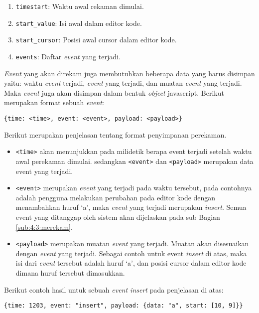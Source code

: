 \begin{enumerate}
    \item \verb|timestart|: Waktu awal rekaman dimulai.
    \item \verb|start_value|: Isi awal dalam editor kode.
    \item \verb|start_cursor|: Posisi awal cursor dalam editor kode.
    \item \verb|events|: Daftar \textit{event} yang terjadi.
\end{enumerate}

\textit{Event} yang akan direkam juga membutuhkan beberapa data yang harus disimpan yaitu: waktu \textit{event} terjadi, \textit{event} yang terjadi, dan muatan \textit{event} yang terjadi. Maka \textit{event} juga akan disimpan dalam bentuk \textit{object} javascript. Berikut merupakan format sebuah \textit{event}:

\begin{center}
    \verb|{time: <time>, event: <event>, payload: <payload>}|
\end{center}

Berikut merupakan penjelasan tentang format penyimpanan perekaman.

\begin{itemize}
    \item \verb|<time>| akan menunjukkan pada milidetik berapa event terjadi setelah waktu awal perekaman dimulai. sedangkan \verb|<event>| dan \verb|<payload>| merupakan data event yang terjadi.
    
    \item \verb|<event>| merupakan \textit{event} yang terjadi pada waktu tersebut, pada contohnya adalah pengguna melakukan perubahan pada editor kode dengan menambahkan huruf `a', maka \textit{event} yang terjadi merupakan \textit{insert}. Semua event yang ditanggap oleh sistem akan dijelaskan pada sub Bagian \ref{sub:4:3:merekam}.
    
    \item \verb|<payload>| merupakan muatan \textit{event} yang terjadi. Muatan akan disesuaikan dengan \textit{event} yang terjadi. Sebagai contoh untuk event \textit{insert} di atas, maka isi dari \textit{event} tersebut adalah huruf `a', dan posisi cursor dalam editor kode dimana huruf tersebut dimasukkan.
\end{itemize}
    
Berikut contoh hasil untuk sebuah \textit{event insert} pada penjelasan di atas:

\begin{center}
    \verb|{time: 1203, event: "insert", payload: {data: "a", start: [10, 9]}}|
\end{center}

